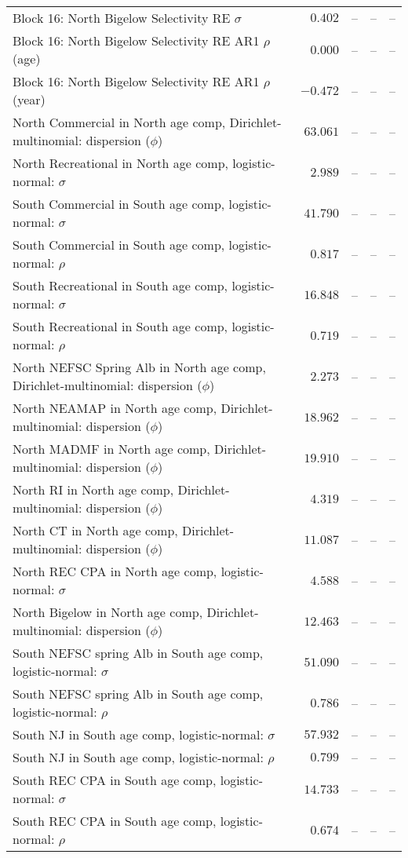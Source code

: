 \documentclass[
]{article}
\begin{document}
\begin{landscape}
\begin{longtable}[t]{lrrrr}
Block 16: North Bigelow Selectivity RE $\sigma$ & $0.402$ & -- & -- & --\\
Block 16: North Bigelow Selectivity RE AR1 $\rho$ (age) & $0.000$ & -- & -- & --\\
\addlinespace
Block 16: North Bigelow Selectivity RE AR1 $\rho$ (year) & $-0.472$ & -- & -- & --\\
North Commercial in North age comp, Dirichlet-multinomial: dispersion ($\phi$) & $63.061$ & -- & -- & --\\
North Recreational in North age comp, logistic-normal: $\sigma$ & $2.989$ & -- & -- & --\\
South Commercial in South age comp, logistic-normal: $\sigma$ & $41.790$ & -- & -- & --\\
South Commercial in South age comp, logistic-normal: $\rho$ & $0.817$ & -- & -- & --\\
\addlinespace
South Recreational in South age comp, logistic-normal: $\sigma$ & $16.848$ & -- & -- & --\\
South Recreational in South age comp, logistic-normal: $\rho$ & $0.719$ & -- & -- & --\\
North NEFSC Spring Alb in North age comp, Dirichlet-multinomial: dispersion ($\phi$) & $2.273$ & -- & -- & --\\
North NEAMAP in North age comp, Dirichlet-multinomial: dispersion ($\phi$) & $18.962$ & -- & -- & --\\
North MADMF in North age comp, Dirichlet-multinomial: dispersion ($\phi$) & $19.910$ & -- & -- & --\\
\addlinespace
North RI in North age comp, Dirichlet-multinomial: dispersion ($\phi$) & $4.319$ & -- & -- & --\\
North CT in North age comp, Dirichlet-multinomial: dispersion ($\phi$) & $11.087$ & -- & -- & --\\
North REC CPA in North age comp, logistic-normal: $\sigma$ & $4.588$ & -- & -- & --\\
North Bigelow in North age comp, Dirichlet-multinomial: dispersion ($\phi$) & $12.463$ & -- & -- & --\\
South NEFSC spring Alb in South age comp, logistic-normal: $\sigma$ & $51.090$ & -- & -- & --\\
\addlinespace
South NEFSC spring Alb in South age comp, logistic-normal: $\rho$ & $0.786$ & -- & -- & --\\
South NJ in South age comp, logistic-normal: $\sigma$ & $57.932$ & -- & -- & --\\
South NJ in South age comp, logistic-normal: $\rho$ & $0.799$ & -- & -- & --\\
South REC CPA in South age comp, logistic-normal: $\sigma$ & $14.733$ & -- & -- & --\\
South REC CPA in South age comp, logistic-normal: $\rho$ & $0.674$ & -- & -- & --\\*
\end{longtable}
\end{landscape}
\end{document}
